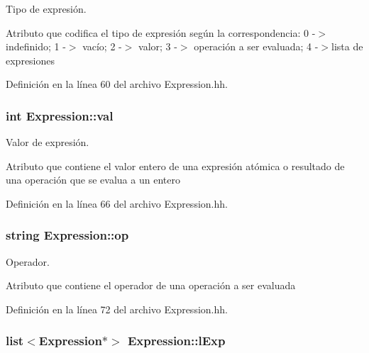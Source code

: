 Tipo de expresión. 

Atributo que codifica el tipo de expresión según la correspondencia\+: 0 -\/$>$ indefinido; 1 -\/$>$ vacío; 2 -\/$>$ valor; 3 -\/$>$ operación a ser evaluada; 4 -\/$>$lista de expresiones 

Definición en la línea 60 del archivo Expression.\+hh.

\subsubsection[{\texorpdfstring{val}{val}}]{\setlength{\rightskip}{0pt plus 5cm}int Expression\+::val\hspace{0.3cm}{\ttfamily [private]}}\hypertarget{class_expression_a9c15b529b5d59e6bffb3855e384c04aa}{}\label{class_expression_a9c15b529b5d59e6bffb3855e384c04aa}


Valor de expresión. 

Atributo que contiene el valor entero de una expresión atómica o resultado de una operación que se evalua a un entero 

Definición en la línea 66 del archivo Expression.\+hh.

\subsubsection[{\texorpdfstring{op}{op}}]{\setlength{\rightskip}{0pt plus 5cm}string Expression\+::op\hspace{0.3cm}{\ttfamily [private]}}\hypertarget{class_expression_a30856695b46075ada151f6f6cdfb9fa8}{}\label{class_expression_a30856695b46075ada151f6f6cdfb9fa8}


Operador. 

Atributo que contiene el operador de una operación a ser evaluada 

Definición en la línea 72 del archivo Expression.\+hh.

\subsubsection[{\texorpdfstring{l\+Exp}{lExp}}]{\setlength{\rightskip}{0pt plus 5cm}list$<${\bf Expression}$\ast$$>$ Expression\+::l\+Exp\hspace{0.3cm}{\ttfamily [private]}}\hypertarget{class_expression_afb4f4617291f7e182cbf2252151b122a}{}\label{class_expression_afb4f4617291f7e182cbf2252151b122a}


